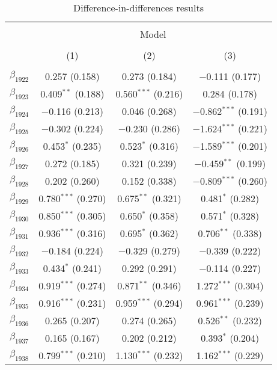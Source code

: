 
\begin{table}[!h] \centering 
  \caption{Difference-in-differences results} 
  \label{dif_table} 
\small 
\begin{tabular}{@{\extracolsep{5pt}}lccc} 
\\[-1.8ex]\hline 
\hline \\[-1.8ex] 
 & \multicolumn{3}{c}{Model} \\ 
\cline{2-4} 
\\[-1.8ex] & (1) & (2) & (3)\\ 
\hline \\[-1.8ex] 
 $\beta_{1922}$ & 0.257 (0.158) & 0.273 (0.184) & $-$0.111 (0.177) \\ 
  $\beta_{1923}$ & 0.409$^{**}$ (0.188) & 0.560$^{***}$ (0.216) & 0.284 (0.178) \\ 
  $\beta_{1924}$ & $-$0.116 (0.213) & 0.046 (0.268) & $-$0.862$^{***}$ (0.191) \\ 
  $\beta_{1925}$ & $-$0.302 (0.224) & $-$0.230 (0.286) & $-$1.624$^{***}$ (0.221) \\ 
  $\beta_{1926}$ & 0.453$^{*}$ (0.235) & 0.523$^{*}$ (0.316) & $-$1.589$^{***}$ (0.201) \\ 
  $\beta_{1927}$ & 0.272 (0.185) & 0.321 (0.239) & $-$0.459$^{**}$ (0.199) \\ 
  $\beta_{1928}$ & 0.202 (0.260) & 0.152 (0.338) & $-$0.809$^{***}$ (0.260) \\ 
  $\beta_{1929}$ & 0.780$^{***}$ (0.270) & 0.675$^{**}$ (0.321) & 0.481$^{*}$ (0.282) \\ 
  $\beta_{1930}$ & 0.850$^{***}$ (0.305) & 0.650$^{*}$ (0.358) & 0.571$^{*}$ (0.328) \\ 
  $\beta_{1931}$ & 0.936$^{***}$ (0.316) & 0.695$^{*}$ (0.362) & 0.706$^{**}$ (0.338) \\ 
  $\beta_{1932}$ & $-$0.184 (0.224) & $-$0.329 (0.279) & $-$0.339 (0.222) \\ 
  $\beta_{1933}$ & 0.434$^{*}$ (0.241) & 0.292 (0.291) & $-$0.114 (0.227) \\ 
  $\beta_{1934}$ & 0.919$^{***}$ (0.274) & 0.871$^{**}$ (0.346) & 1.272$^{***}$ (0.304) \\ 
  $\beta_{1935}$ & 0.916$^{***}$ (0.231) & 0.959$^{***}$ (0.294) & 0.961$^{***}$ (0.239) \\ 
  $\beta_{1936}$ & 0.265 (0.207) & 0.274 (0.265) & 0.526$^{**}$ (0.232) \\ 
  $\beta_{1937}$ & 0.165 (0.167) & 0.202 (0.212) & 0.393$^{*}$ (0.204) \\ 
  $\beta_{1938}$ & 0.799$^{***}$ (0.210) & 1.130$^{***}$ (0.232) & 1.162$^{***}$ (0.229) \\ 

\end{tabular}
\end{table}
